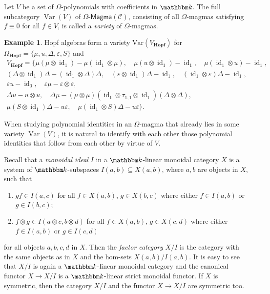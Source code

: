 \documentclass[12pt, reqno, a4paper]{amsart}
\theoremstyle{plain}
\theoremstyle{remark}
\theoremstyle{definition}
\newtheorem{example}[theorem]{Example}
\numberwithin{equation}{section}
\DeclareMathOperator{\id}{id}
\begin{document}
 Let $V$ be a set of $\Omega$-polynomials with coefficients in $\mathbbm k$. The full subcategory $\mathop\mathrm{Var}(V)$ of $\Omega\text{-}\mathsf{Magma}(\mathcal C)$, consisting of all $\Omega$-magmas satisfying $f\equiv 0$ for all $f\in V$, is called a \textit{variety} of $\Omega$-magmas. 
 
 \begin{example}
 	Hopf algebras form a variety $\mathrm{Var}(V_\mathbf{Hopf})$ for $\Omega_\mathbf{Hopf}=\lbrace \mu, u, \Delta, \varepsilon, S \rbrace$ and
 	\begin{equation}\label{EqVHopf}\begin{split}
 	V_\mathbf{Hopf}= \lbrace\mu(\mu \otimes \id_1)-\mu(\id_1 \otimes \mu ),\quad
 	\mu (u\otimes \id_1) - \id_1,\quad
 	\mu (\id_1 \otimes u) - \id_1,\\
 	(\Delta \otimes \id_1)\Delta - (\id_1 \otimes \Delta)\Delta,\quad
 	(\varepsilon \otimes \id_1)\Delta - \id_1, \quad
 	(\id_1 \otimes \varepsilon)\Delta - \id_1, \\
 	\varepsilon u - \id_0, \quad
 	\varepsilon\mu - \varepsilon \otimes \varepsilon, \\
 	\Delta u - u \otimes u,\quad
 	\Delta\mu - (\mu \otimes \mu)(\id_1 \otimes \tau_{1,1} \otimes \id_1)(\Delta \otimes \Delta),\\
 	\mu(S\otimes \id_1)\Delta - u\varepsilon,\quad
 	\mu(\id_1 \otimes S)\Delta - u\varepsilon\rbrace.
 	\end{split}
 	\end{equation}
 \end{example}
 
 When studying polynomial identities in an $\Omega$-magma that already lies in some variety $\mathop\mathrm{Var}(V)$, it is natural to identify with each other those polynomial identities that follow from each other by virtue of $V$.
 
 Recall that a \textit{monoidal ideal} $I$ in a $\mathbbm k$-linear monoidal category $X$ is
 a system of $\mathbbm k$-subspaces $I(a,b) \subseteq X(a,b)$, where $a,b$ are objects in $X$, such that
 \begin{enumerate}
 	\item $gf \in I(a,c)$ for all $f\in X(a,b)$, $g\in X(b,c)$ where either $f\in I(a,b)$
 	or $g\in I(b,c)$;
 	\item $f \otimes g \in I(a \otimes c, b \otimes d)$ for all $f\in X(a,b)$, $g\in X(c,d)$ where either $f\in I(a,b)$
 	or $g\in I(c,d)$
 \end{enumerate}
 for all objects $a,b,c,d$ in $X$. Then the \textit{factor category} $X/I$ is the category with the same objects as in $X$
 and the hom-sets $X(a,b)/I(a,b)$. It is easy to see that $X/I$ is again a $\mathbbm k$-linear monoidal category and the canonical functor $X \to X/I$ is a $\mathbbm k$-linear strict monoidal functor. If $X$ is symmetric, then the category $X/I$ and the functor $X \to X/I$ are symmetric too.
 
\end{document}
